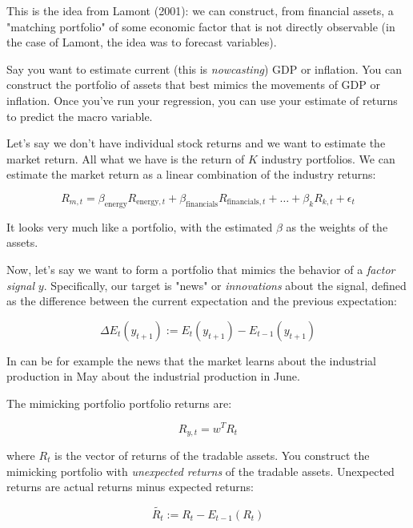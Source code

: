 This is the idea from Lamont (2001): 
we can construct, from financial assets, 
a "matching portfolio" of some economic factor
that is not directly observable (in the case of 
Lamont, the idea was to forecast variables).

Say you want to estimate current (this is \textit{nowcasting})
GDP or inflation. You can construct the portfolio 
of assets that best mimics the movements of GDP or inflation.
Once you've run your regression, you can use your 
estimate of returns to predict the macro variable.

Let's say we don't have individual 
stock returns and we want to estimate 
the market return. All what we have is
the return of $K$ industry portfolios. We 
can estimate the market return as a 
linear combination of the industry returns:

\begin{equation}
R_{m,t} = \beta_{\text{energy}} R_{\text{energy},t} + \beta_{\text{financials}} R_{\text{financials},t} + \ldots + \beta_{k} R_{k,t} + \epsilon_{t}
\end{equation}

It looks very much like a portfolio, with 
the estimated $\beta$ as the weights of the assets.

Now, let's say we want to form a portfolio that 
mimics the behavior of a \textit{factor signal} $y$.
Specifically, our target is "news" or \textit{innovations} about the signal,
defined as the difference between the current expectation 
and the previous expectation:

\begin{equation}
    \Delta E_t(y_{t+1}) := E_t(y_{t+1}) - E_{t-1}(y_{t+1})
\end{equation}

In can be for example the news that the market 
learns about the industrial production in May about 
the industrial production in June.

The mimicking portfolio portfolio returns are:

\begin{equation}
    R_{y, t} = w^T R_t
\end{equation}

where $R_t$ is the vector of returns of the tradable assets.
You construct the mimicking portfolio with 
\textit{unexpected returns} of the tradable assets. Unexpected 
returns are actual returns minus expected returns:

\begin{equation}
    \tilde{R_t} := R_t - E_{t-1}(R_t)
\end{equation}

